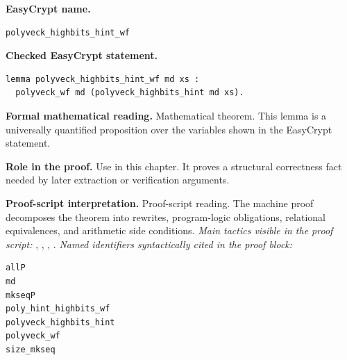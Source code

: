 \begin{formaltheorem}
\noindent\textbf{EasyCrypt name.}
\begin{lstlisting}[language=EasyCrypt,basicstyle=\ttfamily\scriptsize]
polyveck_highbits_hint_wf
\end{lstlisting}
\noindent\textbf{Checked EasyCrypt statement.}
\begin{lstlisting}[language=EasyCrypt,basicstyle=\ttfamily\scriptsize]
lemma polyveck_highbits_hint_wf md xs :
  polyveck_wf md (polyveck_highbits_hint md xs).
\end{lstlisting}
\noindent\textbf{Formal mathematical reading.}
Mathematical theorem. This lemma is a universally quantified proposition over the variables shown in the EasyCrypt statement.

\noindent\textbf{Role in the proof.}
Use in this chapter. It proves a structural correctness fact needed by later extraction or verification arguments.

\noindent\textbf{Proof-script interpretation.}
Proof-script reading. The machine proof decomposes the theorem into rewrites, program-logic obligations, relational equivalences, and arithmetic side conditions.
\emph{Main tactics visible in the proof script:} , , , .
\emph{Named identifiers syntactically cited in the proof block:}
\begin{lstlisting}[language=EasyCrypt,basicstyle=\ttfamily\scriptsize]
allP
md
mkseqP
poly_hint_highbits_wf
polyveck_highbits_hint
polyveck_wf
size_mkseq
\end{lstlisting}

\end{formaltheorem}

